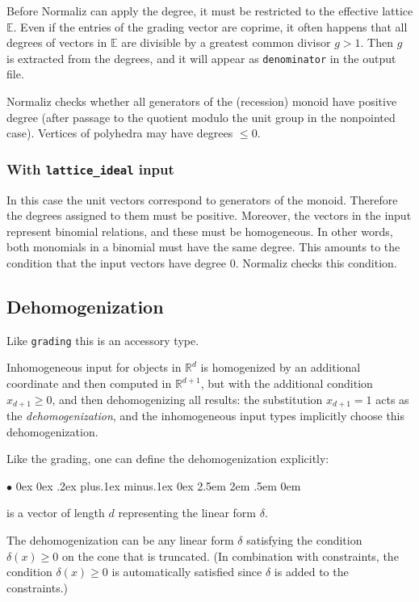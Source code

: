 \documentclass[12pt,a4paper]{scrartcl}
\newcommand{\stdli}{ \topsep0ex \partopsep0ex %
\parsep.2ex plus.1ex minus.1ex \itemsep0ex%
\leftmargin2.5em \labelwidth2em \labelsep.5em \rightmargin0em}%
\renewenvironment{itemize}{\begin{list}{{$\bullet$}}{\stdli}}{\end{list}}
\theoremstyle{definition}
\def\RR{{\mathbb R}}
\def\EE{{\mathbb E}}
\def\itemtt[#1]{\item[\textbf{\ttt{#1}}]}
\def\ttt{\texttt}
\begin{document}
Before Normaliz can apply the degree, it must be restricted
to the effective lattice $\EE$. Even if the entries of the
grading vector are coprime, it often happens that all degrees
of vectors in $\EE$ are divisible by a greatest common divisor
$ g>1$. Then $g$ is extracted from the degrees, and it will
appear as \ttt{denominator} in the output file.

Normaliz checks whether all generators of the (recession) monoid have
positive degree (after passage to the quotient modulo the unit group in the nonpointed case).
Vertices of polyhedra may have degrees $\le 0$.

\subsubsection{With \ttt{lattice\_ideal} input} \label{grad_lattid}

In this case the unit vectors correspond to generators of the
monoid. Therefore the degrees assigned to them must be
positive. Moreover, the vectors in the input represent binomial
relations, and these must be homogeneous. In other words, both
monomials in a binomial must have the same degree. This amounts
to the condition that the input vectors have degree $0$.
Normaliz checks this condition.

\subsection{Dehomogenization}

Like \verb|grading| this is an accessory type.

Inhomogeneous input for objects in $\RR^d$ is homogenized by an additional coordinate and then computed in $\RR^{d+1}$, but with the additional condition $x_{d+1}\ge 0$, and then dehomogenizing all results: the substitution $x_{d+1}=1$ acts as the \emph{dehomogenization}, and the inhomogeneous input types implicitly choose this dehomogenization.

Like the grading, one can define the dehomogenization explicitly:
\begin{itemize}
	\itemtt[dehomogenization] is a vector of length $d$ representing the linear form $\delta$.
\end{itemize}

The dehomogenization can be any linear form $\delta$  satisfying the condition $\delta(x)\ge 0$ on the cone that is truncated. (In combination with constraints, the condition $\delta(x)\ge 0$ is automatically satisfied since $\delta$ is added to the constraints.)
\end{document}
